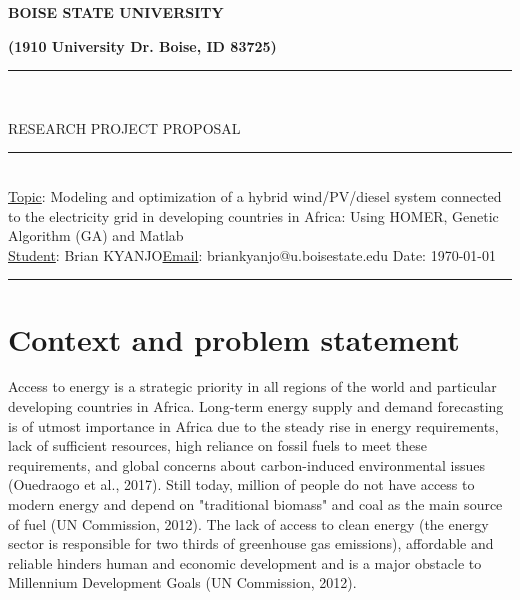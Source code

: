 \documentclass[11.8pt,a4paper]{article}
\begin{document}
	
	\thispagestyle{empty}
	\begin{center}
		\huge\textbf{BOISE STATE UNIVERSITY \\}
		
			\small\textbf{(1910 University Dr. Boise, ID 83725)}
	\end{center}	
	\noindent
	\rule{17cm}{0.2cm}\\[0.05cm]
	\begin{center}
		RESEARCH PROJECT PROPOSAL
	\end{center}
	\rule{17cm}{0.05cm}
	\vspace{0.5cm}
\noindent\\
\underline{Topic}: Modeling and optimization of a hybrid wind/PV/diesel system
connected to the electricity grid in developing countries in Africa: Using HOMER, Genetic Algorithm (GA) and Matlab\hfill\\

\noindent\underline{Student}: Brian KYANJO\hfill \underline{Email}: briankyanjo@u.boisestate.edu \hfill Date: \today\\
\rule{17cm}{0.05cm}
\section{Context and problem statement}
Access to energy is a strategic priority in all regions of the world and particular developing countries in Africa. Long-term energy supply and demand forecasting is of utmost importance in Africa due to the steady rise in energy requirements, lack of sufficient resources, high reliance on fossil fuels to meet these requirements, and global concerns about carbon-induced environmental issues (Ouedraogo et al., 2017). Still today, million of people do not have access to modern energy and depend on "traditional biomass" and coal as the main source of fuel (UN Commission, 2012). The lack of access to clean energy (the energy sector is responsible for two thirds of greenhouse gas emissions), affordable and reliable hinders human and economic development and is a major obstacle to Millennium Development Goals (UN Commission, 2012).
\end{document}
